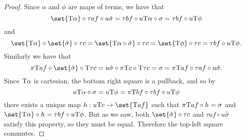 \documentclass[../thesis.tex]{subfiles}
\begin{document}
\begin{proof}
  Since $\alpha$ and $\phi$ are maps of terms, we have that
  \[\set{\typ\alpha} \circ \tau a f \circ u\hat\sigma = \tau bf \circ u\typ\alpha \circ \sigma = \tau bf \circ u\typ\phi\]
  and
  \[\set{\typ\alpha} \circ \set{\hat\sigma} \circ \tau c = \set{\typ\alpha \circ \hat\sigma} \circ \tau c =
  \set{\typ\phi} \circ \tau c = \tau bf \circ u\typ\phi.\]
  Similarly we have that
  \[\pi\typ af \circ \set{\hat\sigma} \circ \typ\tau c = u\hat\sigma \circ \pi\typ c \circ \typ\tau c = \sigma
  = \pi\typ af \circ \tau af \circ u\hat\sigma.\]
  Since ${{\mathrm{T}}}\alpha$ is cartesian, the bottom right square is a pullback, and so by
  \[u{{\mathrm{T}}}\alpha \circ \sigma = u{{\mathrm{T}}}\phi = \pi{{\mathrm{T}}} b f \circ \tau bf \circ u{{\mathrm{T}}}\phi\]
  there exists a unique map $h : u\typ c \to \set{\typ a f}$ such that $\pi{{\mathrm{T}}} a f \circ h = \sigma$ and $\set{\typ\alpha}
  \circ h = \tau bf \circ u\typ\phi$. But as we saw, both $\set{\hat\sigma} \circ \tau c$ and $\tau a f \circ u\hat\sigma$
  satisfy this property, so they must be equal. Therefore the top-left square commutes.
\end{proof}
\end{document}
